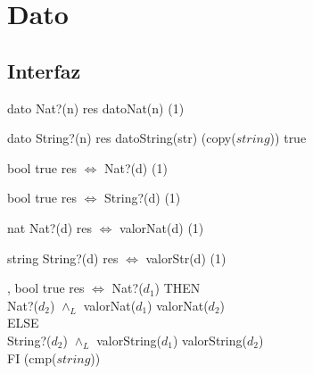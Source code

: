\section{Dato}

\subsection{Interfaz}

\iusa{}

\ioperaciones

{} %
{dato} %
{Nat?(n)} %
{res \igobs datoNat(n)} %
{\bigo(1)} %
{} %
{} %

{}
{dato}
{String?(n)}
{res \igobs datoString(str)}
{\bigo(copy($string$))}
{true}
{}

{}
{bool}
{true}
{res $\iff$ Nat?(d)}
{\bigo(1)}
{}
{}

{}
{bool}
{true}
{res $\iff$ String?(d)}
{\bigo(1)}
{}
{}

{}
{nat}
{Nat?(d)}
{res $\iff$ valorNat(d)}
{\bigo(1)}
{}
{}

{}
{string}
{String?(d)}
{res $\iff$ valorStr(d)}
{\bigo(1)}
{}
{}

\operacion{$\bullet == \bullet$}
{, }
{bool}
{true}
{res $\iff$ \IFL Nat?($d_1$) THEN \\
    \hspace*{10.5em} Nat?($d_2$) $\land_L$ valorNat($d_1$) \igobs valorNat($d_2$) \\
    \hspace*{9em} ELSE \\
    \hspace*{10.5em} String?($d_2$) $\land_L$ valorString($d_1$) \igobs valorString($d_2$) \\
    \hspace*{9em} FI }
{\bigo(cmp($string$))}
{}
{}

